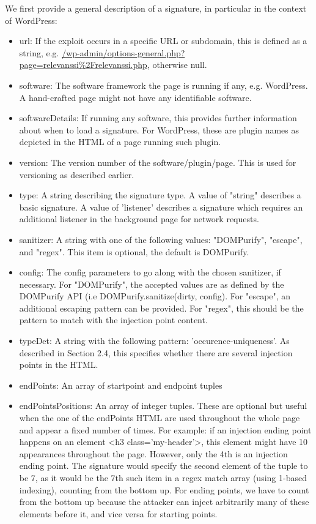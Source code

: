 We first provide a general description of a signature, in particular in the context of WordPress:
\begin{itemize}
	\item
	url: If the exploit occurs in a specific URL or subdomain, this is defined as a string, e.g.
	 \url{/wp-admin/options-general.php?page=relevanssi\%2Frelevanssi.php}, otherwise null.
	\item
	software: The software framework the page is running if any, e.g. WordPress. A hand-crafted page
	might not have any identifiable software.
	\item
	softwareDetails: If running any software, this provides further information about when to load a signature. For WordPress, these are plugin names as depicted in the HTML of a page running such plugin.
	\item
	version: The version number of the software/plugin/page. This is used for versioning as described earlier.
	\item 
	type: A string describing the signature type. A value of "string" describes a basic signature. A value of 'listener' describes a signature which requires an additional listener in the background page for network requests.
	\item 
	sanitizer: A string with one of the following values: "DOMPurify", "escape", and "regex". This item is optional, the default is DOMPurify.
	\item
	config: The config parameters to go along with the chosen sanitizer, if necessary. For "DOMPurify", the accepted values are as defined by the DOMPurify API (i.e DOMPurify.sanitize(dirty, config). For "escape", an additional escaping pattern can be provided. For "regex", this should be the pattern to match with the injection point content.
	\item
	typeDet: A string with the following pattern: 'occurence-uniqueness'. As described in Section 2.4, this specifies whether there are several injection points in the HTML.
	\item
	endPoints: An array of startpoint and endpoint tuples
	\item 
	endPointsPositions: An array of integer tuples. These are optional but useful when the one of the endPoints HTML are used throughout the whole page and appear a fixed number of times. For example: if an injection ending point happens on an element <h3 class='my-header'>, this element might have 10 appearances throughout the page. However, only the 4th is an injection ending point. The signature would specify the second element of the tuple to be 7, as it would be the 7th such item in a regex match array (using 1-based indexing), counting from the bottom up. For ending points, we have to count from the bottom up because the attacker can inject arbitrarily many of these elements before it, and vice versa for starting points.
\end{itemize}

